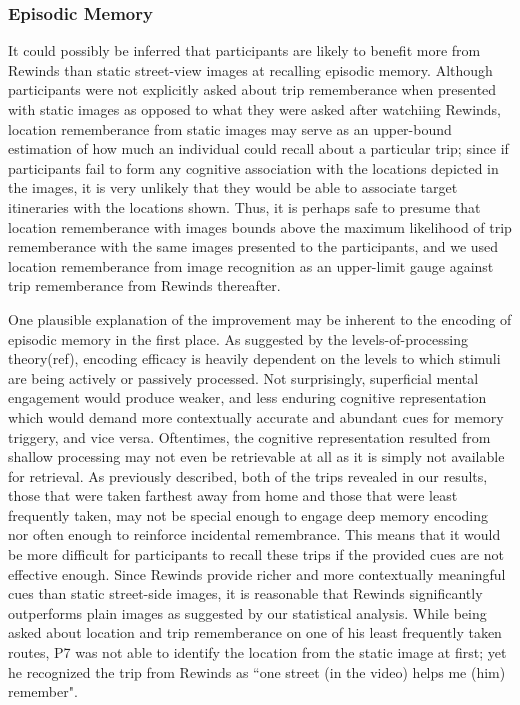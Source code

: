 \documentclass{sigchi}
\begin{document}
\subsubsection{Episodic Memory}
It could possibly be inferred that participants are likely to benefit more from Rewinds than static street-view images at recalling episodic memory. Although participants were not explicitly asked about trip rememberance when presented with static images as opposed to what they were asked after watchiing Rewinds, location rememberance from static images may serve as an upper-bound estimation of how much an individual could recall about a particular trip; since if participants fail to form any cognitive association with the locations depicted in the images, it is very unlikely that they would be able to associate target itineraries with the locations shown. Thus, it is perhaps safe to presume that location rememberance with images bounds above the maximum likelihood of trip rememberance with the same images presented to the participants, and we used location rememberance from image recognition as an upper-limit gauge against trip rememberance from Rewinds thereafter.

One plausible explanation of the improvement may be inherent to the encoding of episodic memory in the first place. As suggested by the levels-of-processing theory(ref), encoding efficacy is heavily dependent on the levels to which stimuli are being actively or passively processed. Not surprisingly, superficial mental engagement would produce weaker, and less enduring cognitive representation which would demand more contextually accurate and abundant cues for memory triggery, and vice versa. Oftentimes, the cognitive representation resulted from shallow processing may not even be retrievable at all as it is simply not available for retrieval.  As previously described, both of the trips revealed in our results, those that were taken farthest away from home and those that were least frequently taken, may not be special enough to engage deep memory encoding nor often enough to reinforce incidental remembrance. This means that it would be more difficult for participants to recall these trips if the provided cues are not effective enough. Since Rewinds provide richer and more contextually meaningful cues than static street-side images, it is reasonable that Rewinds significantly outperforms plain images as suggested by our statistical analysis. While being asked about location and trip rememberance on one of his least frequently taken routes, P7 was not able to identify the location from the static image at first; yet he recognized the trip from Rewinds as ``one street (in the video) helps me (him) remember". 
\end{document}
